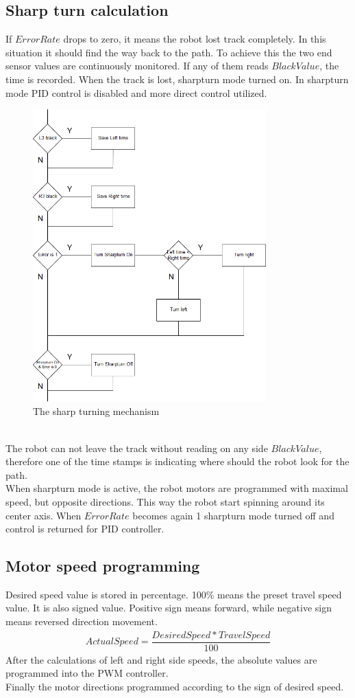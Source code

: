 \documentclass[11pt,a4paper,oneside,article]{memoir}
\begin{document}
\subsection{Sharp turn calculation}
If $ErrorRate$ drops to zero, it means the robot lost track completely. In this situation it should find the way back to the path. To achieve this the two end sensor values are continuously monitored. If any of them reads $BlackValue$, the time is recorded. When the track is lost, sharpturn mode turned on. In sharpturn mode PID control is disabled and more direct control utilized.
\begin{figure}[h]
	\centering
	\includegraphics[width=9cm]{illustration/Sharpturn}
	\caption{The sharp turning mechanism}
	\label{fig:Sharpturn}
\end{figure}\\
The robot can not leave the track without reading on any side $BlackValue$, therefore one of the time stamps is indicating where should the robot look for the path.\\
When sharpturn mode is active, the robot motors are programmed with maximal speed, but opposite directions. This way the robot start spinning around its center axis. When $ErrorRate$ becomes again 1 sharpturn mode turned off and control is returned for PID controller.

\subsection{Motor speed programming}
Desired speed value is stored in percentage. 100\% means the preset travel speed value. It is also signed value. Positive sign means forward, while negative sign means reversed direction movement.\\
\begin{align}
ActualSpeed = \dfrac{DesiredSpeed * TravelSpeed}{100}
\end{align}
After the calculations of left and right side speeds, the absolute values are programmed into the PWM controller.\\
Finally the motor directions programmed according to the sign of desired speed.
\end{document}
